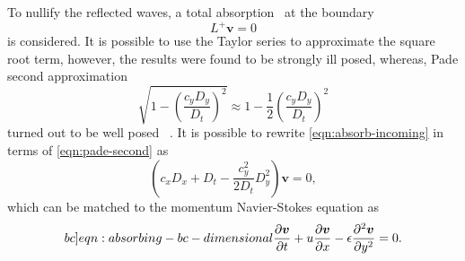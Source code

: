 \documentclass{article}
\numberwithin{equation}{section}
\begin{document}
To nullify the reflected waves, a total absorption~\cite{Engquist:1977} at the boundary
\begin{equation}\label{eqn:absorb-incoming}
	L^+\boldsymbol{v}=0
\end{equation}
is considered. It is possible to use the Taylor series to approximate the square root term, however, the results were found to be strongly ill posed, whereas, Pade second approximation
\begin{equation}\label{eqn:pade-second}
	\sqrt{1-\left( \frac{c_y D_y}{D_t}\right)^2}\approx1-\frac{1}{2}\left( \frac{c_y D_y}{D_t}\right)^2
\end{equation}
turned out to be well posed~\cite{Engquist:1977,Kreiss:1970} . It is possible to rewrite \cref{eqn:absorb-incoming} in terms of \cref{eqn:pade-second} as
\begin{equation*}
	\left( c_xD_x + D_t - \frac{c^2_y}{2D_t}D_y^2 \right)\boldsymbol{v}=0,
\end{equation*}
which can be matched to the momentum Navier-Stokes equation as
\begin{equation}\label[bc]{eqn:absorbing-bc-dimensional}
	\frac{\partial \boldsymbol{v}}{\partial t} + u\frac{\partial \boldsymbol{v}}{\partial x}-\epsilon\frac{\partial ^2 \boldsymbol{v}}{\partial y^2}=0.
\end{equation}
\end{document}
